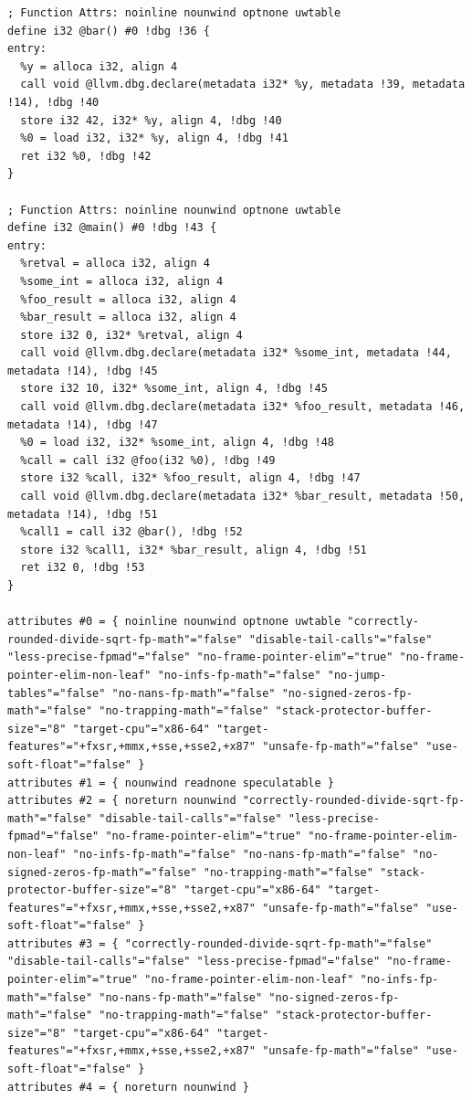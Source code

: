 \documentclass[12pt, twoside]{fithesis2}
\renewcommand{\_}{\leavevmode \kern0.07em\vbox{\hrule width0.4em}}
\begin{document}
\begin{verbatim}
; Function Attrs: noinline nounwind optnone uwtable
define i32 @bar() #0 !dbg !36 {
entry:
  %y = alloca i32, align 4
  call void @llvm.dbg.declare(metadata i32* %y, metadata !39, metadata !14), !dbg !40
  store i32 42, i32* %y, align 4, !dbg !40
  %0 = load i32, i32* %y, align 4, !dbg !41
  ret i32 %0, !dbg !42
}

; Function Attrs: noinline nounwind optnone uwtable
define i32 @main() #0 !dbg !43 {
entry:
  %retval = alloca i32, align 4
  %some_int = alloca i32, align 4
  %foo_result = alloca i32, align 4
  %bar_result = alloca i32, align 4
  store i32 0, i32* %retval, align 4
  call void @llvm.dbg.declare(metadata i32* %some_int, metadata !44, metadata !14), !dbg !45
  store i32 10, i32* %some_int, align 4, !dbg !45
  call void @llvm.dbg.declare(metadata i32* %foo_result, metadata !46, metadata !14), !dbg !47
  %0 = load i32, i32* %some_int, align 4, !dbg !48
  %call = call i32 @foo(i32 %0), !dbg !49
  store i32 %call, i32* %foo_result, align 4, !dbg !47
  call void @llvm.dbg.declare(metadata i32* %bar_result, metadata !50, metadata !14), !dbg !51
  %call1 = call i32 @bar(), !dbg !52
  store i32 %call1, i32* %bar_result, align 4, !dbg !51
  ret i32 0, !dbg !53
}

attributes #0 = { noinline nounwind optnone uwtable "correctly-rounded-divide-sqrt-fp-math"="false" "disable-tail-calls"="false" "less-precise-fpmad"="false" "no-frame-pointer-elim"="true" "no-frame-pointer-elim-non-leaf" "no-infs-fp-math"="false" "no-jump-tables"="false" "no-nans-fp-math"="false" "no-signed-zeros-fp-math"="false" "no-trapping-math"="false" "stack-protector-buffer-size"="8" "target-cpu"="x86-64" "target-features"="+fxsr,+mmx,+sse,+sse2,+x87" "unsafe-fp-math"="false" "use-soft-float"="false" }
attributes #1 = { nounwind readnone speculatable }
attributes #2 = { noreturn nounwind "correctly-rounded-divide-sqrt-fp-math"="false" "disable-tail-calls"="false" "less-precise-fpmad"="false" "no-frame-pointer-elim"="true" "no-frame-pointer-elim-non-leaf" "no-infs-fp-math"="false" "no-nans-fp-math"="false" "no-signed-zeros-fp-math"="false" "no-trapping-math"="false" "stack-protector-buffer-size"="8" "target-cpu"="x86-64" "target-features"="+fxsr,+mmx,+sse,+sse2,+x87" "unsafe-fp-math"="false" "use-soft-float"="false" }
attributes #3 = { "correctly-rounded-divide-sqrt-fp-math"="false" "disable-tail-calls"="false" "less-precise-fpmad"="false" "no-frame-pointer-elim"="true" "no-frame-pointer-elim-non-leaf" "no-infs-fp-math"="false" "no-nans-fp-math"="false" "no-signed-zeros-fp-math"="false" "no-trapping-math"="false" "stack-protector-buffer-size"="8" "target-cpu"="x86-64" "target-features"="+fxsr,+mmx,+sse,+sse2,+x87" "unsafe-fp-math"="false" "use-soft-float"="false" }
attributes #4 = { noreturn nounwind }


\end{verbatim}
\end{document}
